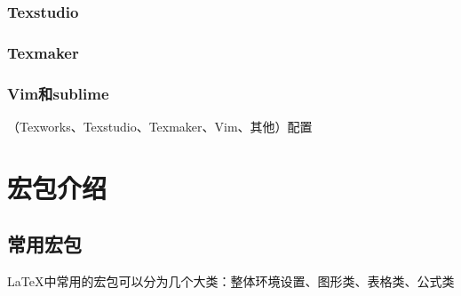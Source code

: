 \documentclass[12pt]{book}
\begin{document}
\subsection{Texstudio}

\subsection{Texmaker}

\subsection{Vim和sublime}
（Texworks、Texstudio、Texmaker、Vim、其他）配置

\chapter{宏包介绍}

\section{常用宏包}

\LaTeX{}中常用的宏包可以分为几个大类：整体环境设置、图形类、表格类、公式类
\end{document}
